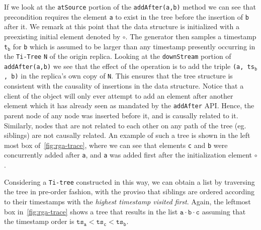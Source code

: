 If we look at the \lstinline|atSource| portion of the
\lstinline|addAfter(a,b)| method we can see that precondition requires
the element \lstinline|a| to exist in the tree before the insertion of
\lstinline|b| after it.
%
We remark at this point that the data structure is initialized with a
preexisting initial element denoted by $\circ$.
%
The generator then samples a timestamp \lstinline|t|$_{\mathtt{b}}$
for \lstinline|b| which is assumed to be larger than any
timestamp presently occurring in the \lstinline|Ti-Tree|
\lstinline|N| of the origin replica.
%
Looking at the \lstinline|downStream| portion of
\lstinline|addAfter(a,b)| we see that the effect of the operation is
to add the triple \lstinline|(a, ts|$_{\mathtt{b}}$\lstinline|, b)|
in the replica's own copy of \lstinline|N|.
%
This ensures that the tree structure is consistent with the causality
of insertions in the data structure.
%
Notice that a client of the object will only ever attempt to add an
element after another element which it has already seen as mandated by
the \lstinline|addAfter| API.
%
Hence, the parent node of any node was inserted before it, and is
causally related to it.
%
Similarly, nodes that are not related to each other on any path of
the tree (eg. siblings) are not causally related.
%
An example of such a tree is shown in the left most box
of~\autoref{fig:rga-trace}, where we can see that
elements \lstinline|c| and \lstinline|b| were concurrently added after
\lstinline|a|, and \lstinline|a| was added first after the
initialization element $\circ$.

Considering a \lstinline|Ti-tree| constructed in this way, we can
obtain a list by traversing the tree in pre-order fashion, with the
proviso that siblings are ordered according to their timestamps with
the \emph{highest timestamp visited first}.
%
Again, the leftmost box in~\autoref{fig:rga-trace} shows a tree that
results in the list $\mathtt{a \cdot b \cdot c}$ assuming that the
timestamp order is $\mathtt{ts_a < ts_c < ts_b}$.

